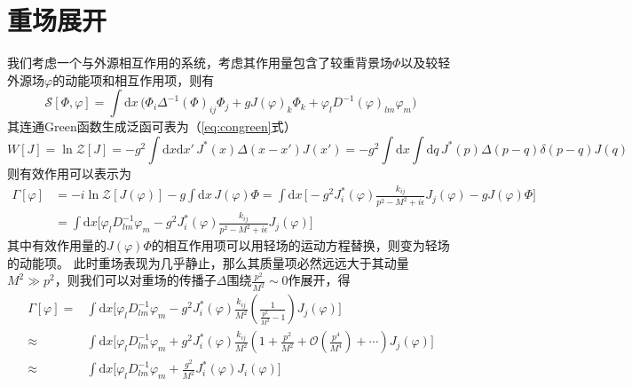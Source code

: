 \section{重场展开}

我们考虑一个与外源相互作用的系统，考虑其作用量包含了较重背景场$\Phi$以及较轻外源场$\varphi$的动能项和相互作用项，则有
\begin{equation}
    \mathcal{S}[\Phi,\varphi] = \int\mathrm{d}x\, \Big(\Phi_i\Delta^{-1}(\Phi)_{ij} \Phi_j + g J(\varphi)_k\Phi_k  + \varphi_l D^{-1}(\varphi)_{lm}\varphi_m\Big)
\end{equation}
其连通Green函数生成泛函可表为（\eqref{eq:congreen}式）
\begin{equation}
    W[J] = \ln \mathscr{Z}[J] =  -{g^2}\int\mathrm{d}{x}\mathrm{d}{x}'\,  J^*(x) \Delta(x-x')J(x') = -{g^2}\int\mathrm{d}x\int{\mathrm{d}q}\, J^*(p) \Delta(p-q)\delta(p-q) J(q)
\end{equation}
则有效作用可以表示为
\begin{equation}
\begin{split}
        \Gamma[\varphi]&= -i\ln\mathscr{Z}[J(\varphi)]-g\int\mathrm{d}x\, J(\varphi)\Phi = \int\mathrm{d}x \,\Big[ -{g^2}J_i^*(\varphi) \frac{k_{ij}}{p^2 - M^2+i\epsilon} J_j(\varphi) -gJ(\varphi)\Phi  \Big]\\
        &= \int\mathrm{d}x\Big[ \varphi_l D^{-1}_{lm}\varphi_m  -{g^2}J_i^*(\varphi) \frac{k_{ij}}{p^2 - M^2+i\epsilon} J_j(\varphi)\Big]
\end{split}
\end{equation}
其中有效作用量的$J(\varphi)\Phi$的相互作用项可以用轻场的运动方程替换，则变为轻场的动能项。
此时重场表现为几乎静止，那么其质量项必然远远大于其动量$M^2\gg p^2$，则我们可以对重场的传播子$\Delta$围绕$\frac{p^2}{M^2}\sim0$作展开，得
\begin{equation}
\begin{split}
    \Gamma[\varphi] =& \int\mathrm{d}x \Big[\varphi_l D^{-1}_{lm}\varphi_m - g^2 J_i^*(\varphi)\frac{k_{ij}}{M^2}\left(\frac{1}{\frac{p^2}{M^2}-1} \right)J_j(\varphi)\Big] \\\approx&  \int\mathrm{d}x \Big[\varphi_l D^{-1}_{lm}\varphi_m + g^2 J_i^*(\varphi)\frac{k_{ij}}{M^2}\left(1 + \frac{p^2}{M^2} +\mathcal{O}\left( \frac{p^4}{M^4} \right)+\cdots \right)J_j(\varphi)\Big]\\
    \approx&\int\mathrm{d}x\Big[\varphi_l D^{-1}_{lm}\varphi_m +  \frac{g^2}{M^2}J^*_i(\varphi)  J_i(\varphi) \Big]
\end{split}
\end{equation}
